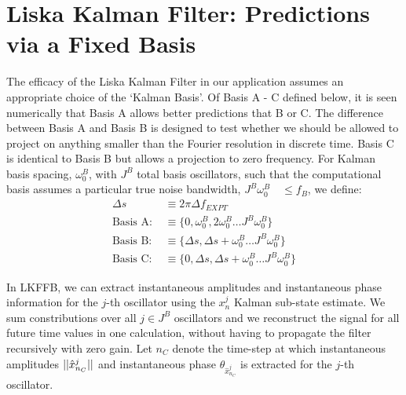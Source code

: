 \section{Liska Kalman Filter: Predictions via a Fixed Basis} \label{sec:ap_liska_fixedbasis}
The efficacy of the Liska Kalman Filter in our application assumes an appropriate choice of the `Kalman Basis'. Of  Basis A - C defined below, it is seen numerically that Basis A allows better predictions that B or C. The  difference between Basis A and Basis B is designed to test whether we should be allowed to project on anything smaller than the Fourier resolution in discrete time. Basis C is identical to Basis B but allows a projection to zero frequency. For Kalman basis spacing, $\omega_0^B$, with $J^B$ total basis oscillators, such that the computational basis assumes a particular true noise bandwidth, $J^B \omega_0^B \quad \leq f_B$, we define:
\begin{align}
\Delta s & \equiv 2\pi\Delta f_{EXPT} \\
\text{Basis A: } & \equiv \{0, \omega_0^B, 2\omega_0^B \dots  J^B \omega_0^B \} \\
\text{Basis B: } & \equiv \{ \Delta s, \Delta s + \omega_0^B \dots J^B \omega_0^B \} \\
\text{Basis C: } & \equiv \{ 0, \Delta s, \Delta s + \omega_0^B \dots  J^B \omega_0^B \} 
\end{align}

In LKFFB, we can extract instantaneous amplitudes and instantaneous phase information for the $j$-th  oscillator using the $x^j_n$ Kalman sub-state estimate. We sum constributions over all $j\in J^B$ oscillators and we reconstruct the signal for all future time values in one calculation, without having to propagate the filter recursively with zero gain. Let $n_C$ denote the time-step at which instantaneous amplitudes $||\hat{x}^j_{n_C}||$ and instantaneous phase $\theta_{\hat{x}^j_{n_C}}$ is extracted for the $j$-th oscillator.

